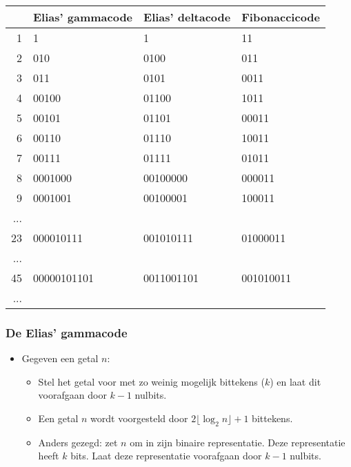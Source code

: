 \begin{table}[ht]
    \centering
    \begin{tabular}{|r | l | l | l |}
        \hline
        & Elias' gammacode & Elias' deltacode & Fibonaccicode \\
        \hline
        1 & 1 & 1 & 11  \\
        2 & 010 & 0100 & 011 \\
        3 & 011 & 0101 & 0011  \\
        4 & 00100 & 01100 & 1011  \\
        5 & 00101 & 01101 & 00011  \\
        6 & 00110 & 01110 & 10011  \\
        7 & 00111 & 01111 & 01011  \\
        8 & 0001000 & 00100000 & 000011  \\
        9 & 0001001 & 00100001 & 100011  \\
        ... &  &  &   \\
        23 & 000010111 & 001010111 & 01000011  \\
        ... &  &  &   \\
        45 & 00000101101 & 0011001101 & 001010011  \\
        ... &  &  &   \\

        \hline
    \end{tabular}
\end{table}

\subsubsection{De Elias' gammacode}
\begin{itemize}
    \item Gegeven een getal $n$:
    \begin{itemize}
        \item Stel het getal voor met zo weinig mogelijk bittekens ($k$) en laat dit voorafgaan door $k - 1$ nulbits.
        \item Een getal $n$ wordt voorgesteld door $2\lfloor \log_2 n\rfloor + 1$ bittekens.
        \item Anders gezegd: zet $n$ om in zijn binaire representatie. Deze representatie heeft $k$ bits. Laat deze representatie voorafgaan door $k - 1$ nulbits.
    \end{itemize}
\end{itemize}

